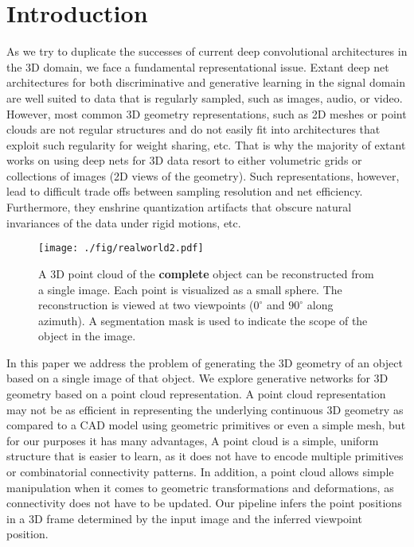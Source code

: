 \documentclass[10pt,twocolumn,letterpaper]{article}
\begin{document}
\section{Introduction}
\label{sec:intro}%

As we try to duplicate the successes of current deep convolutional architectures in the 3D domain, we face a fundamental representational issue. Extant deep net architectures for both discriminative and generative learning in the signal domain are well suited to data that is regularly sampled, such as images, audio, or video. However, most common 3D geometry representations, such as 2D meshes or point clouds are not regular structures and do not easily fit into architectures that exploit such regularity for weight sharing, etc.  That is why the majority of extant works on using deep nets for 3D data resort to either volumetric grids or collections of images (2D views of the geometry). Such representations, however, lead to difficult trade offs between sampling resolution and net efficiency. Furthermore, they enshrine quantization artifacts that obscure natural invariances of the data under rigid motions, etc.
\begin{figure}[t!]
	\centering
	\texttt{[image: ./fig/realworld2.pdf]}
	\caption{A 3D point cloud of the {\bf complete} object can be reconstructed from a single image. Each point is visualized as a small sphere. The reconstruction is viewed at two viewpoints ($0^{\circ}$ and $90^{\circ}$ along azimuth). A segmentation mask is used to indicate the scope of the object in the image.}
	\label{fig:teaser}
	\vspace{-1em}
\end{figure}

In this paper we address the problem of generating the 3D geometry of an object based on a single image of that object. We explore generative networks for 3D geometry based on a point cloud representation. A point cloud representation may not be as efficient in representing the underlying continuous 3D geometry as compared to a CAD model using geometric primitives or even a simple mesh, but for our purposes it has many advantages, A point cloud is a simple, uniform structure that is easier to learn, as it does not have to encode multiple primitives or combinatorial connectivity patterns. In addition, a point cloud allows simple manipulation when it comes to geometric transformations and deformations, as connectivity does not have to be updated. Our pipeline infers the point positions in a 3D frame determined by the input image and the inferred viewpoint position.
\end{document}
